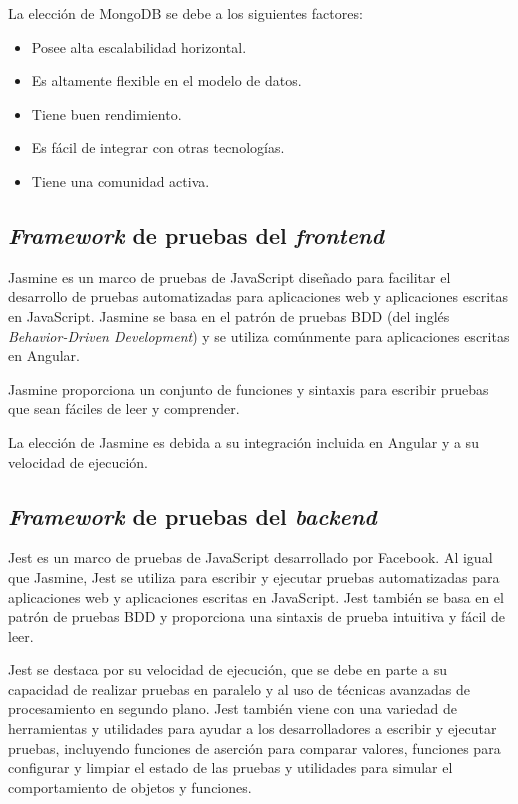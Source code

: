 
La elección de MongoDB se debe a los siguientes factores: 
\begin{itemize}
	\item Posee alta escalabilidad horizontal.
	\item Es altamente flexible en el modelo de datos.
	\item Tiene buen rendimiento.
	\item Es fácil de integrar con otras tecnologías.
	\item Tiene una comunidad activa.
\end{itemize}

\subsection{\emph{Framework} de pruebas del \emph{frontend}}

Jasmine \citep{WEBSITE:JASMINE} es un marco de pruebas de JavaScript diseñado para facilitar el desarrollo de pruebas automatizadas para aplicaciones web y aplicaciones escritas en JavaScript. Jasmine se basa en el patrón de pruebas BDD (del inglés \textit{Behavior-Driven Development}) \citep{WEBSITE:BDD} y se utiliza comúnmente para aplicaciones escritas en Angular.

Jasmine proporciona un conjunto de funciones y sintaxis para escribir pruebas que sean fáciles de leer y comprender.

La elección de Jasmine es debida a su integración incluida en Angular y a su velocidad de ejecución.

\subsection{\emph{Framework} de pruebas del \emph{backend}}

Jest \citep{WEBSITE:JESTJS} es un marco de pruebas de JavaScript desarrollado por Facebook. Al igual que Jasmine, Jest se utiliza para escribir y ejecutar pruebas automatizadas para aplicaciones web y aplicaciones escritas en JavaScript. Jest también se basa en el patrón de pruebas BDD y proporciona una sintaxis de prueba intuitiva y fácil de leer.

Jest se destaca por su velocidad de ejecución, que se debe en parte a su capacidad de realizar pruebas en paralelo y al uso de técnicas avanzadas de procesamiento en segundo plano. Jest también viene con una variedad de herramientas y utilidades para ayudar a los desarrolladores a escribir y ejecutar pruebas, incluyendo funciones de aserción para comparar valores, funciones  para configurar y limpiar el estado de las pruebas y utilidades para simular el comportamiento de objetos y funciones.

